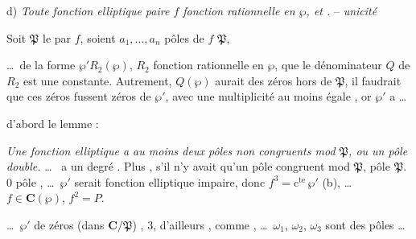 \documentclass[11pt,a4paper]{article}
\begin{document}
d) \emph{Toute fonction elliptique paire $f$  fonction rationnelle
en $\wp$, et .} -- \emph{unicité}

Soit $\mathfrak{P}$ le  \ill{} \ill{} par $f$,
soient $a_1, \ldots, a_n$  \struck{\ill{} \ill{}
\ill{}} pôles de $f$   $\mathfrak{P}$,
\struck{\ill{} \ill{} \ill{}}

\ldots\ de la forme $\wp' R_2(\wp)$, $R_2$ fonction rationnelle en $\wp$,
 que le dénominateur $Q$ de $R_2$ est une constante.
Autrement, $Q(\wp)$  aurait des zéros hors
de $\mathfrak{P}$, il faudrait que ces zéros fussent zéros de $\wp'$, avec une
multiplicité au moins égale  \ill{}, or $\wp'$ a \ldots

 d'abord le lemme :

\emph{ Une fonction elliptique a au moins deux pôles non congruents
mod $\mathfrak{P}$, ou un pôle double.}
\marginal{\ill{} \ill{} \ill{} \ill{} \ill{} \ill{} \ill{} \ill{}}
\ldots\  a un degré  \ill{}. Plus
, s'il n'y avait qu'un pôle  congruent
mod $\mathfrak{P}$,  \ill{} \ill{} \ill{} pôle 
$\mathfrak{P}$.  $0$  pôle
, \ill{} \ill{} \ill{} \ill{}
\ldots\ $\wp'$ serait fonction elliptique impaire, donc 
$f^3 = \text{c}^{\text{te}}\,\wp'$ (b),
\ldots\ \ill{} \ill{} \ill{} $f\in
\mathbf{C}(\wp)$, $f^2 = P$.

\ldots\ $\wp'$  de zéros (dans $\mathbf{C}/\mathfrak{P}$)
,  $3$, d'ailleurs \ill{} \ill{}, comme \ill{}
\ill{} \ill{}, \ldots\ $\omega_1$, $\omega_2$, $\omega_3$ sont des pôles \ldots
\end{document}
